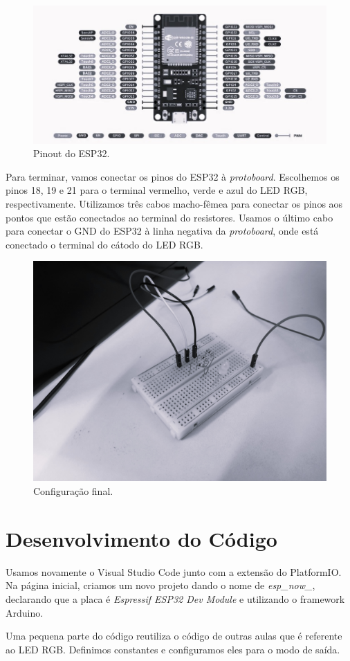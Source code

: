 \documentclass[12pt]{article}
\begin{document}
\begin{figure}[H]
    \centering
    \includegraphics[width=0.5\linewidth]{img/esp32_pinout.png}
    \caption{Pinout do ESP32.}
    \label{fig:esp32-pinout}
\end{figure}

Para terminar, vamos conectar os pinos do ESP32 à \textit{protoboard}. Escolhemos os pinos 18, 19 e 21 para o terminal vermelho, verde e azul do LED RGB, respectivamente. Utilizamos três cabos macho-fêmea para conectar os pinos aos pontos que estão conectados ao terminal do resistores. Usamos o último cabo para conectar o GND do ESP32 à linha negativa da \textit{protoboard}, onde está conectado o terminal do cátodo do LED RGB.

\begin{figure}[H]
    \centering
    \includegraphics[width=0.5\linewidth]{img/20241125_095139.jpg}
    \caption{Configuração final.}
    \label{fig:final-config}
\end{figure}

\section{Desenvolvimento do Código}

Usamos novamente o Visual Studio Code junto com a extensão do PlatformIO. Na página inicial, criamos um novo projeto dando o nome de \textit{esp\_now\_}, declarando que a placa é \textit{Espressif ESP32 Dev Module} e utilizando o framework Arduino.

Uma pequena parte do código reutiliza o código de outras aulas que é referente ao LED RGB. Definimos constantes e configuramos eles para o modo de saída.
\end{document}
